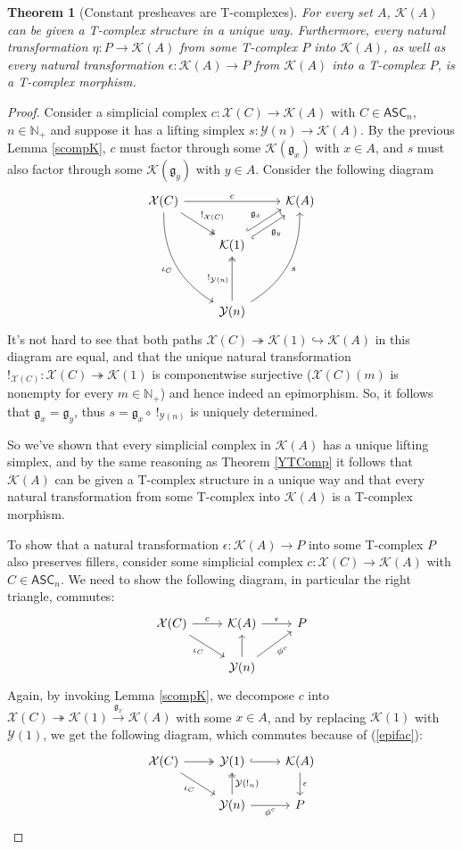 \documentclass{article}
\newtheorem{theorem}{Theorem}[subsection]
\theoremstyle{remark}
\theoremstyle{definition}
\newcommand{\N}{\mathbb N}
\newcommand{\ASC}{\mathsf{ASC}}
\newcommand{\Y}{\mathcal Y}
\newcommand{\X}{\mathcal X}
\newcommand{\K}{\mathcal K}
\newcommand{\g}{\mathfrak g}
\begin{document}
	\begin{theorem}[Constant presheaves are T-complexes]\label{KTComp}
		For every set $A$, $\K(A)$ can be given a T-complex structure in a unique way. Furthermore, every natural transformation $\eta:P\to\K(A)$ from some T-complex $P$ into $\K(A)$, as well as every natural transformation $\epsilon:\K(A)\to P$ from $\K(A)$ into a T-complex $P$, is a T-complex morphism.
	\end{theorem}
	\begin{proof}
		Consider a simplicial complex $c:\X(C)\to\K(A)$ with $C\in\ASC_n$, $n\in\N_+$ and suppose it has a lifting simplex $s:\Y(n)\to\K(A)$. By the previous Lemma \ref{scompK}, $c$ must factor through some $\K(\g_x)$ with $x\in A$, and $s$ must also factor through some $\K(\g_y)$ with $y\in A$. Consider the following diagram
		\[\begin{tikzcd}
			\X(C)\arrow{rr}{c}\arrow[two heads]{dr}{!_{\X(C)}}\arrow[bend right=30]{dddr}[swap]{\iota_C}&&\K(A)\\
			&\K(1)\arrow[hook,shift left=1mm]{ur}{\g_x}\arrow[hook',shift right=1mm]{ur}[swap]{\g_y}\\\\
			&\Y(n)\arrow[two heads]{uu}{!_{\Y(n)}}\arrow[bend right=30]{uuur}[swap]{s}
		\end{tikzcd}\]
		It's not hard to see that both paths $\X(C)\twoheadrightarrow\K(1)\hookrightarrow\K(A)$ in this diagram are equal, and that the unique natural transformation $!_{\X(C)}:\X(C)\twoheadrightarrow\K(1)$ is componentwise surjective ($\X(C)(m)$ is nonempty for every $m\in\N_+$) and hence indeed an epimorphism. So, it follows that $\g_x=\g_y$, thus $s=\g_x\circ\ !_{\Y(n)}$ is uniquely determined.
		
		So we've shown that every simplicial complex in $\K(A)$ has a unique lifting simplex, and by the same reasoning as Theorem \ref{YTComp} it follows that $\K(A)$ can be given a T-complex structure in a unique way and that every natural transformation from some T-complex into $\K(A)$ is a T-complex morphism.
		
		To show that a natural transformation $\epsilon:\K(A)\to P$ into some T-complex $P$ also preserves fillers, consider some simplicial complex $c:\X(C)\to\K(A)$ with $C\in\ASC_n$. We need to show the following diagram, in particular the right triangle, commutes:
		\[\begin{tikzcd}
			\X(C)\arrow{r}{c}\arrow{dr}[swap]{\iota_C}&\K(A)\arrow{r}{\epsilon}&P\\
			&\Y(n)\arrow{u}\arrow{ur}[swap]{\phi^c}
		\end{tikzcd}\]
		Again, by invoking Lemma \ref{scompK}, we decompose $c$ into $\X(C)\twoheadrightarrow\K(1)\xrightarrow{\g_x}\K(A)$ with some $x\in A$, and by replacing $\K(1)$ with $\Y(1)$, we get the following diagram, which commutes because of (\ref{epifac}):
		\[\begin{tikzcd}
			\X(C)\arrow[two heads]{r}\arrow{dr}[swap]{\iota_C}&\Y(1)\arrow[hook]{r}&\K(A)\arrow{d}{\epsilon}\\
			&\Y(n)\arrow[two heads]{u}[swap]{\Y(!_n)}\arrow{r}[swap]{\phi^c}&P
		\end{tikzcd}\]
	\end{proof}
\end{document}
